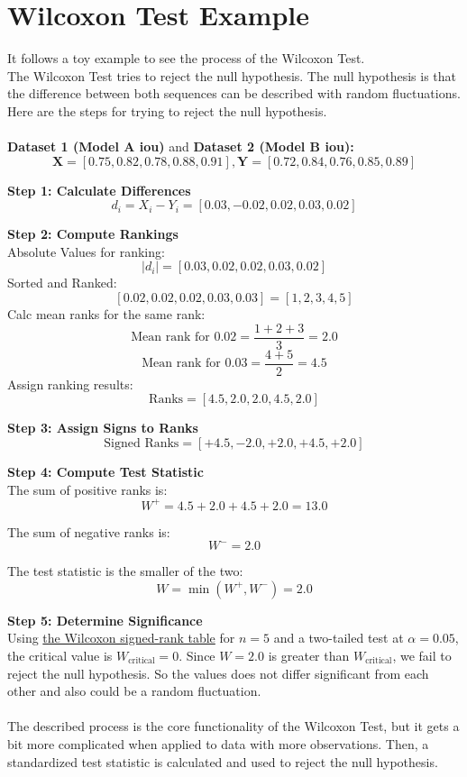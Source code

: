 \chapter{Wilcoxon Test Example}
\label{appendix:wilcoxon-test-example}
	It follows a toy example to see the process of the Wilcoxon Test.\\
	The Wilcoxon Test tries to reject the null hypothesis. The null hypothesis is that the difference between both sequences can be described with random fluctuations. Here are the steps for trying to reject the null hypothesis.\\
	\\
	\textbf{Dataset 1 (Model A \ac{iou})} and \textbf{Dataset 2 (Model B \ac{iou}):}
	\[
	\mathbf{X} = [0.75, 0.82, 0.78, 0.88, 0.91], \mathbf{Y} = [0.72, 0.84, 0.76, 0.85, 0.89]
	\]
	
	\textbf{Step 1: Calculate Differences}
	\[
	d_i = X_i - Y_i = [0.03, -0.02, 0.02, 0.03, 0.02]
	\]
	
	\textbf{Step 2: Compute Rankings}\\
	Absolute Values for ranking:
	\[
	|d_i| = [0.03, 0.02, 0.02, 0.03, 0.02]
	\]
	Sorted and Ranked:
	\[
	[0.02, 0.02, 0.02, 0.03, 0.03] = [1, 2, 3, 4, 5]
	\]
	Calc mean ranks for the same rank:
	\[
	\text{Mean rank for } 0.02 = \frac{1 + 2 + 3}{3} = 2.0
	\]
	\[
	\text{Mean rank for } 0.03 = \frac{4 + 5}{2} = 4.5
	\]
	Assign ranking results:
	\[
	\text{Ranks} = [4.5, 2.0, 2.0, 4.5, 2.0]
	\]
	
	\textbf{Step 3: Assign Signs to Ranks}
	\[
	\text{Signed Ranks} = [+4.5, -2.0, +2.0, +4.5, +2.0]
	\]
	
	\textbf{Step 4: Compute Test Statistic}\\
	The sum of positive ranks is:
	\[
	W^+ = 4.5 + 2.0 + 4.5 + 2.0 = 13.0
	\]
	
	The sum of negative ranks is:
	\[
	W^- = 2.0
	\]
	
	The test statistic is the smaller of the two:
	\[
	W = \min(W^+, W^-) = 2.0
	\]
	
	\textbf{Step 5: Determine Significance}\\
	Using \href{https://de.wikipedia.org/wiki/Wilcoxon-Vorzeichen-Rang-Test#Teststatistik}{the Wilcoxon signed-rank table} for \( n = 5 \) and a two-tailed test at \( \alpha = 0.05 \), the critical value is \( W_\text{critical} = 0 \). Since \( W = 2.0 \) is greater than \( W_\text{critical} \), we fail to reject the null hypothesis. So the values does not differ significant from each other and also could be a random fluctuation.\\
	\\
	The described process is the core functionality of the Wilcoxon Test, but it gets a bit more complicated when applied to data with more observations. Then, a standardized test statistic is calculated and used to reject the null hypothesis.


